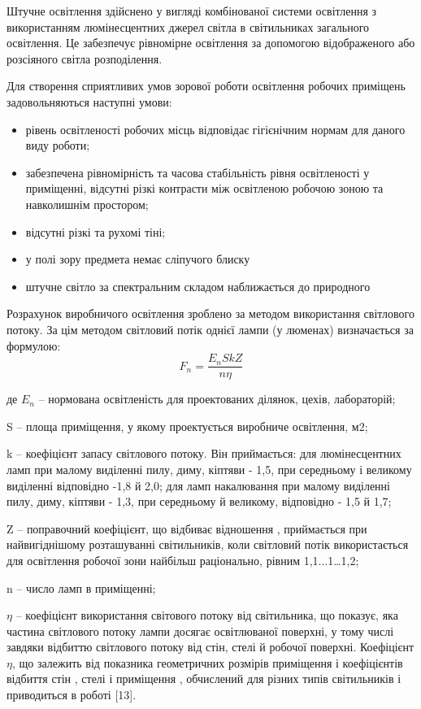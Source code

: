 \documentclass[ukrainian,utf8,simple,floatsingle,hpadding=5mm]{eskdtext}
\begin{document}
Штучне освітлення здійснено у вигляді комбінованої системи освітлення з 
використанням люмінесцентних джерел світла в світильниках загального освітлення. 
Це забезпечує рівномірне освітлення за допомогою відображеного або розсіяного 
світла розподілення.

Для створення сприятливих умов зорової роботи освітлення робочих приміщень задовольняються наступні умови:
\begin{itemize}
 \item рівень освітленості робочих місць відповідає гігієнічним нормам для даного виду роботи;
 \item забезпечена рівномірність та часова стабільність рівня освітленості у приміщенні, відсутні різкі контрасти між освітленою робочою зоною та навколишнім простором;
 \item відсутні різкі та рухомі тіні;
 \item у полі зору предмета немає сліпучого блиску
 \item штучне світло за спектральним складом наближається до природного
\end{itemize}


Розрахунок виробничого освітлення зроблено за методом використання 
світлового потоку. За цім методом світловий потік однієї лампи (у люменах) визначається за формулою:
\begin{equation}
\label{eq:fnop}
 F_n = \frac{E_{n}SkZ}{n \eta}
\end{equation}
\begin{ESKDexplanation}
\item де $E_n$ -- нормована освітленість для проектованих ділянок, цехів, лабораторій;
\item S – площа приміщення, у якому проектується виробниче освітлення, м2;
\item k – коефіцієнт запасу світлового потоку. Він приймається: для люмінесцентних ламп при малому виділенні пилу, диму, кіптяви - 1,5, при середньому і великому виділенні відповідно -1,8 й 2,0; для ламп накалювання при малому виділенні пилу, диму, кіптяви - 1,3, при середньому й великому, відповідно - 1,5 й 1,7;
\item Z – поправочний коефіцієнт, що відбиває відношення  , приймається при найвигіднішому розташуванні світильників, коли світловий потік використається для освітлення робочої зони найбільш раціонально, рівним 1,1...1…1,2; 
\item n – число ламп в приміщенні;
\item  $\eta$ – коефіцієнт використання світового потоку від світильника, що показує, яка частина світлового потоку лампи   досягає освітлюваної поверхні, у тому числі завдяки відбиттю світлового потоку від стін, стелі й робочої поверхні.
Коефіцієнт $\eta$, що залежить від показника геометричних розмірів приміщення   і коефіцієнтів відбиття стін  , стелі   і приміщення  , обчислений для різних типів світильників і приводиться в роботі [13].	  
\end{ESKDexplanation}
\end{document}
